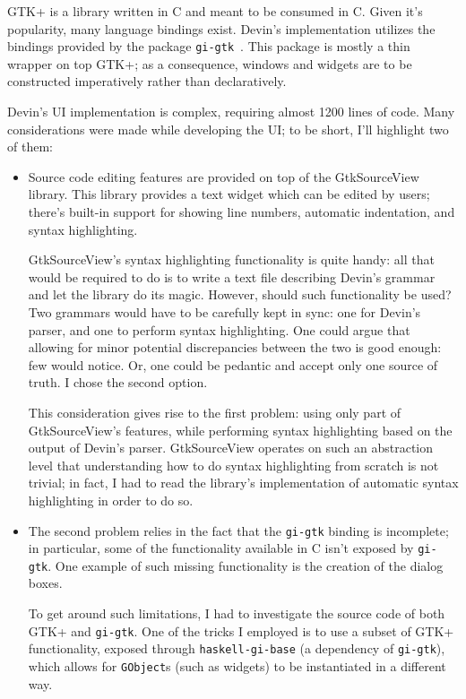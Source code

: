 \documentclass[UdineBachThesis,american,11pt]{PhdThesis}
\begin{document}
  GTK+ is a library written in C and meant to be consumed in C. Given it's
  popularity, many language bindings exist. Devin's implementation utilizes the
  bindings provided by the package \mbox{\texttt{gi-gtk}}~\cite{gi-gtk}. This
  package is mostly a thin wrapper on top GTK+; as a consequence, windows and
  widgets are to be constructed imperatively rather than declaratively.

  Devin's UI implementation is complex, requiring almost 1200 lines of code.
  Many considerations were made while developing the UI; to be short, I'll
  highlight two of them:

  \begin{itemize}
    \item Source code editing features are provided on top of the GtkSourceView
    library. This library provides a text widget which can be edited by users;
    there's built-in support for showing line numbers, automatic indentation,
    and syntax highlighting.

    \pagebreak

    GtkSourceView's syntax highlighting functionality is quite handy: all that
    would be required to do is to write a text file describing Devin's grammar
    and let the library do its magic. However, should such functionality be
    used? Two grammars would have to be carefully kept in sync: one for Devin's
    parser, and one to perform syntax highlighting. One could argue that
    allowing for minor potential discrepancies between the two is good enough:
    few would notice. Or, one could be pedantic and accept only one source of
    truth. I chose the second option.

    This consideration gives rise to the first problem: using only part of
    GtkSourceView's features, while performing syntax highlighting based on the
    output of Devin's parser. GtkSourceView operates on such an abstraction
    level that understanding how to do syntax highlighting from scratch is not
    trivial; in fact, I had to read the library's implementation of automatic
    syntax highlighting in order to do so.

    \item The second problem relies in the fact that the \mbox{\texttt{gi-gtk}}
    binding is incomplete; in particular, some of the functionality available in
    C isn't exposed by \mbox{\texttt{gi-gtk}}. One example of such missing
    functionality is the creation of the dialog boxes.

    To get around such limitations, I had to investigate the source code of both
    GTK+ and \mbox{\texttt{gi-gtk}}. One of the tricks I employed is to use a
    subset of GTK+ functionality, exposed through
    \mbox{\texttt{haskell-gi-base}} (a dependency of \mbox{\texttt{gi-gtk}}),
    which allows for \mbox{\texttt{GObject}s} (such as widgets) to be
    instantiated in a different way.
  \end{itemize}
\end{document}
